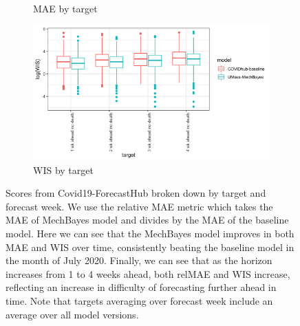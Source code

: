 \documentclass[11pt]{amsart}
\begin{document}
\begin{figure}
\begin{subfigure}{.5\textwidth}
    \caption{MAE by target}
\end{subfigure}%
\begin{subfigure}{.5\textwidth}
  \centering
    \includegraphics[scale=.135]{wis_results_by_target_inc.png}
    \caption{WIS by target}
\end{subfigure}%

\caption{Scores from Covid19-ForecastHub broken down by target and forecast week. We use the relative MAE metric which takes the MAE of MechBayes model and divides by the MAE of the baseline model. Here we can see that the MechBayes model improves in both MAE and WIS over time, consistently beating the baseline model in the month of July 2020.  Finally, we can see that as the horizon increases from 1 to 4 weeks ahead, both relMAE and WIS increase, reflecting an increase in difficulty of forecasting further ahead in time. Note that targets averaging over forecast week include an average over all model versions. }
\label{fig:covidhub_appendix}
\end{figure}
\end{document}
